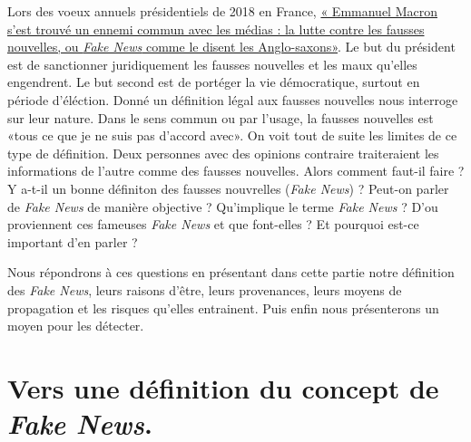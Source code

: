 \documentclass[11pt,a4paper,oldfontcommands]{memoir}
\begin{document}
Lors des voeux annuels présidentiels de 2018 en France,  \href{https://www.20minutes.fr/politique/2196019-20180103-vux-presse-macron-veut-censurer-fake-news-prone-saine-distance-entre-pouvoir-medias}{« Emmanuel Macron s’est trouvé un ennemi commun avec les médias : la lutte contre les fausses nouvelles, ou \textit{Fake News} comme le disent les Anglo-saxons»}.
Le but du président est de sanctionner juridiquement les fausses nouvelles et les maux qu'elles engendrent.
Le but second est de portéger la vie démocratique, surtout en période d'éléction.
Donné un définition légal aux fausses nouvelles nous interroge sur leur nature.
Dans le sens commun ou par l'usage, la fausses nouvelles est «tous ce que je ne suis pas d'accord avec».
On voit tout de suite les limites de ce type de définition.
Deux personnes avec des opinions contraire traiteraient les informations de l'autre comme des fausses nouvelles.
Alors comment faut-il faire ?
Y a-t-il un bonne définiton des fausses nouvrelles (\textit{Fake News}) ?
Peut-on parler de \textit{Fake News} de manière objective ?
Qu'implique le terme \textit{Fake News} ?
D'ou proviennent ces fameuses \textit{Fake News} et que font-elles ?
Et pourquoi est-ce important d'en parler ?

Nous répondrons à ces questions en présentant dans cette partie notre définition des \textit{Fake News}, leurs raisons d'être, leurs provenances, leurs moyens de propagation et les risques qu'elles entrainent.
Puis enfin nous présenterons un moyen pour les détecter.


\section{Vers une définition du concept de \textit{Fake News}.}
\end{document}
